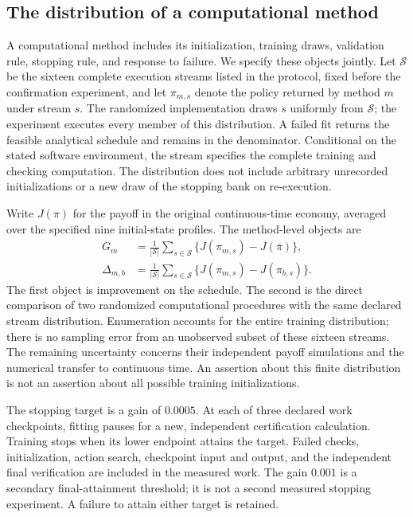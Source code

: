 \subsection{The distribution of a computational method}
\label{sec:r15methoddistribution}

A computational method includes its initialization, training draws, validation
rule, stopping rule, and response to failure. We specify these objects jointly.
Let $\mathcal S$ be the sixteen complete execution streams listed in the
protocol, fixed before the confirmation experiment, and let $\pi_{m,s}$ denote
the policy returned by method $m$ under stream $s$. The randomized implementation
draws $s$ uniformly from $\mathcal S$; the experiment executes every member of
this distribution. A failed fit returns the feasible analytical schedule and
remains in the denominator. Conditional on the stated software environment,
the stream specifies the complete training and checking computation. The
distribution does not include arbitrary unrecorded initializations or a new
draw of the stopping bank on re-execution.

Write $J(\pi)$ for the payoff in the original continuous-time economy,
averaged over the specified nine initial-state profiles. The method-level
objects are
\begin{align}
 G_m&=\frac{1}{|\mathcal S|}\sum_{s\in\mathcal S}
       \{J(\pi_{m,s})-J(\bar\pi)\},\label{eq:r15methodgain}\\
 \Delta_{m,b}&=\frac{1}{|\mathcal S|}\sum_{s\in\mathcal S}
       \{J(\pi_{m,s})-J(\pi_{b,s})\}.
       \label{eq:r15methodcontrast}
\end{align}
The first object is improvement on the schedule. The second is the direct
comparison of two randomized computational procedures with the same declared
stream distribution. Enumeration accounts for the entire training distribution;
there is no sampling error from an unobserved subset of these sixteen streams.
The remaining uncertainty concerns their independent payoff simulations and
the numerical transfer to continuous time. An assertion about this finite
distribution is not an assertion about all possible training initializations.

The stopping target is a gain of $0.0005$. At each of three declared work
checkpoints, fitting pauses for a new, independent certification calculation.
Training stops when its lower endpoint attains the target. Failed checks,
initialization, action search, checkpoint input and output, and the independent
final verification are included in the measured work. The gain $0.001$ is a
secondary final-attainment threshold; it is not a second measured stopping
experiment. A failure to attain either target is retained.

